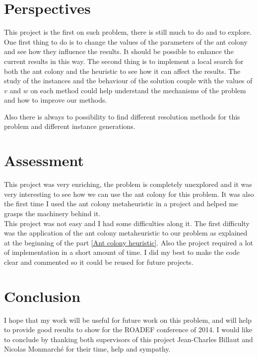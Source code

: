 \documentclass[UTF8, twoside]{EPURapport}
\begin{document}
\chapter{Perspectives}

	\hspace{4ex}This project is the first on such problem, there is still much to do and to explore. One first thing to do is to change the values of the parameters of the ant colony and see how they influence the results. It should be possible to enhance the current results in this way. The second thing is to implement a local search for both the ant colony and the heuristic to see how it can affect the results. The study of the instances and the behaviour of the solution couple with the values of $v$ and $w$ on each method could help understand the mechanisms of the problem and how to improve our methods.
	
	Also there is always to possibility to find different resolution methods for this problem and different instance generations.

\chapter{Assessment}

	\hspace{4ex}This project was very enriching, the problem is completely unexplored and it was very interesting to see how we can use the ant colony for this problem. It was also the first time I used the ant colony metaheuristic in a project and helped me grasps the machinery behind it.
\\

	This project was not easy and I had some difficulties along it. The first difficulty was the application of the ant colony metaheuristic to our problem as explained at the beginning of the part \ref{Ant colony heuristic}. Also the project required a lot of implementation in a short amount of time. I did my best to make the code clear and commented so it could be reused for future projects.

\chapter{Conclusion}

	\hspace{4ex}I hope that my work will be useful for future work on this problem, and will help to provide good results to show for the ROADEF conference of 2014. I would like to conclude by thanking both supervisors of this project Jean-Charles Billaut and Nicolas Monmarché for their time, help and sympathy.
\end{document}
